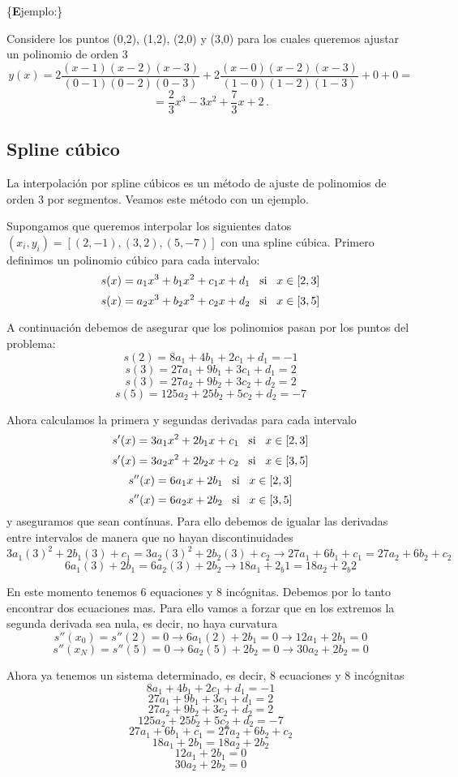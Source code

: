 \documentclass[
]{agujournal2019}
\begin{document}
\{\noindent \textbf Ejemplo:\}

Considere los puntos (0,2), (1,2), (2,0) y (3,0) para los cuales
queremos ajustar un polinomio de orden 3
\[y(x)=2\frac{(x-1)(x-2)(x-3)}{(0-1)(0-2)(0-3)} + 2\frac{(x-0)(x-2)(x-3)}{(1-0)(1-2)(1-3)} + 0
+ 0=\] \[=\frac{2}{3}x^3 -3x^2 +\frac{7}{3}x +2\,.\]

\subsection{Spline cúbico}

La interpolación por spline cúbicos es un método de ajuste de polinomios
de orden 3 por segmentos. Veamos este método con un ejemplo.

Supongamos que queremos interpolar los siguientes datos
\((x_i,y_i)=[(2,-1), (3,2), (5,-7)]\) con una spline cúbica. Primero
definimos un polinomio cúbico para cada intervalo:
\[s(x)=a_1x^3 + b_1 x^2 +c_1x +d_1\,\,\,\,\,{\rm si}\,\,\,\,\,x\in[2,3]\]
\[s(x)=a_2x^3 + b_2 x^2 +c_2x +d_2\,\,\,\,\,{\rm si}\,\,\,\,\,x\in[3,5]\]

A continuación debemos de asegurar que los polinomios pasan por los
puntos del problema: \[s(2)=8a_1 + 4b_1  +2c_1 +d_1=-1\]
\[s(3)=27a_1 + 9b_1  +3c_1 +d_1=2\] \[s(3)=27a_2 + 9b_2  +3c_2 +d_2=2\]
\[s(5)=125a_2 + 25b_2  +5c_2 +d_2=-7\]

Ahora calculamos la primera y segundas derivadas para cada intervalo
\[s'(x)=3a_1x^2+2b_1x+c_1\,\,\,\,\,{\rm si}\,\,\,\,\,x\in[2,3]\]
\[s'(x)=3a_2x^2+2b_2x+c_2\,\,\,\,\,{\rm si}\,\,\,\,\,x\in[3,5]\]
\[s''(x)=6a_1x+2b_1\,\,\,\,\,{\rm si}\,\,\,\,\,x\in[2,3]\]
\[s''(x)=6a_2x+2b_2\,\,\,\,\,{\rm si}\,\,\,\,\,x\in[3,5]\] y aseguramos
que sean contínuas. Para ello debemos de igualar las derivadas entre
intervalos de manera que no hayan discontinuidades
\[3a_1(3)^2+2b_1(3)+c_1=3a_2(3)^2+2b_2(3)+c_2\rightarrow 27a_1+6b_1+c_1=27a_2+6b_2+c_2\]
\[6a_1(3)+2b_1=6a_2(3)+2b_2\rightarrow 18a_1+2_b1=18a_2+2_b2\]

En este momento tenemos 6 equaciones y 8 incógnitas. Debemos por lo
tanto encontrar dos ecuaciones mas. Para ello vamos a forzar que en los
extremos la segunda derivada sea nula, es decir, no haya curvatura
\[s''(x_0)=s''(2)=0\rightarrow 6a_1(2)+2b_1=0 \rightarrow 12a_1 + 2b_1=0\]
\[s''(x_N)=s''(5)=0\rightarrow 6a_2(5)+2b_2=0 \rightarrow 30a_2+2b_2=0\]

Ahora ya tenemos un sistema determinado, es decir, 8 ecuaciones y 8
incógnitas \[8a_1 + 4b_1  +2c_1 +d_1=-1\] \[27a_1 + 9b_1  +3c_1 +d_1=2\]
\[27a_2 + 9b_2  +3c_2 +d_2=2\] \[125a_2 + 25b_2  +5c_2 +d_2=-7\]
\[27a_1+6b_1+c_1=27a_2+6b_2+c_2\] \[18a_1+2b_1=18a_2+2b_2\]
\[12a_1 + 2b_1=0\] \[30a_2+2b_2=0\]
\end{document}
